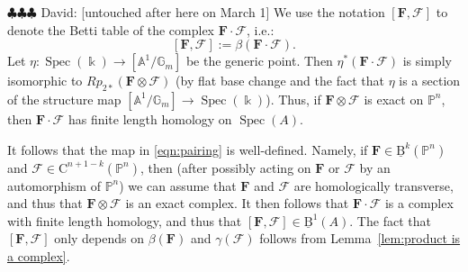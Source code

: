 \documentclass[12pt]{amsart}
\theoremstyle{definition}
\theoremstyle{remark}
\newcommand{\Spec}{\operatorname{Spec}}
\newcommand{\kk}{\Bbbk}
\newcommand{\PP}{\mathbb{P}}
\renewcommand{\AA}{\mathbb{A}}
\newcommand{\GG}{\mathbb{G}}
\newcommand{\cF}{\mathcal{F}}
\newcommand{\FF}{\mathbf{F}}
\newcommand{\CQ}{\mathrm{C}}
\newcommand{\BBQ}{\underline{\mathrm{B}}}
\newcommand{\david}[1]{{\color{red} \sf $\clubsuit\clubsuit\clubsuit$ David: [#1]}}
\begin{document}
\david{untouched after here on March 1}
We use the notation $[\FF,\cF]$ to denote the Betti table of the complex $\FF\cdot \cF$, i.e.:
\[
[\FF,\cF]:=\beta( \FF\cdot \cF).
\]
Let $\eta: \Spec(\kk)\to [\AA^1/\GG_m]$ be the generic point.  Then $\eta^*(\FF\cdot \cF)$ is simply isomorphic to $Rp_{2*}(\FF\otimes \cF)$ (by flat base change and the fact that $\eta$ is a section of the structure map $[\AA^1/\GG_m]\to \Spec(\kk)$).  Thus, if $\FF\otimes \cF$ is exact on $\PP^n$, then $\FF\cdot \cF$ has finite length homology on $\Spec(A)$.

It follows that the map in \eqref{eqn:pairing} is well-defined.  Namely, if $\FF\in \BBQ^k(\PP^n)$ and $\cF\in \CQ^{n+1-k}(\PP^n)$, then (after possibly acting on $\FF$ or $\cF$ by an automorphism of $\PP^n$) we can assume that $\FF$ and $\cF$ are homologically transverse, and thus that $\FF\otimes \cF$ is an exact complex.  It then follows that $\FF\cdot \cF$ is a complex with finite length homology, and thus that $[\FF, \cF]\in \BBQ^1(A)$.  The fact that $[\FF,\cF]$ only depends on $\beta(\FF)$ and $\gamma(\cF)$ follows from Lemma~\ref{lem:product is a complex}.
\end{document}
